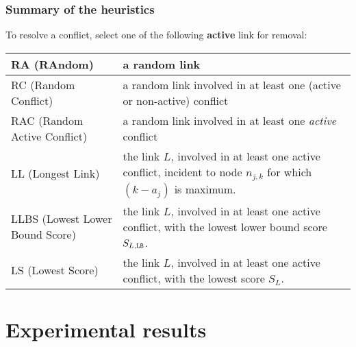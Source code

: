 \documentclass[xcolor=dvipsnames,envcountsect,handout]{beamer}
\begin{document}


\begin{frame}
\frametitle{Summary of the heuristics}
\vspace{-6pt}
To resolve a conflict, select one of the following {\bf active} link 
for removal: \vspace{6pt}\\
\begin{minipage}{12cm}
\begin{footnotesize}
\begin{center}
\begin{tabular}{p{3cm}p{7.5cm}}
RA (RAndom) & a random link \\
\midrule
RC (Random Conflict) & a random link involved in at least one 
(active or non-active) conflict\\
\midrule
RAC (Random Active Conflict) & a random link involved in at least 
one {\em active} conflict\\
\midrule
LL (Longest Link) & the link $L$, involved in at least one active 
conflict, incident to node $n_{j,k}$ for which $(k-a_j)$ is maximum.\\
\midrule
LLBS (Lowest Lower Bound Score) & the link $L$, involved in at least
one active conflict, with the lowest lower bound score 
$S_{L,{\tt LB}}$.\\
\midrule
LS (Lowest Score) & the link $L$, involved in at least one active 
conflict, with the lowest score $S_L$.
\end{tabular}
\end{center}
\end{footnotesize}
\end{minipage}
\end{frame}


\section{Experimental results}


\end{document}
